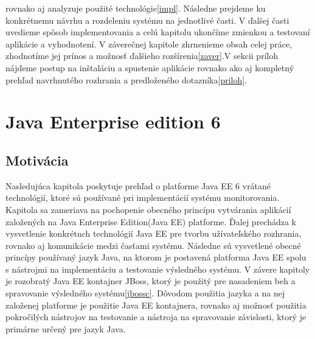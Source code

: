 rovnako aj analyzuje použité technológie\ref{impl}. Následne prejdeme ku konkrétnemu návrhu a rozdeleniu systému na jednotlivé časti. V ďalšej časti uvedieme spôsob implementovania a celú kapitolu ukončíme zmienkou a testovaní aplikácie a vyhodnotení. V záverečnej kapitole zhrnenieme obsah celej práce, zhodnotíme jej prínos a možnosť ďalšieho rozšírenia\ref{zaver}.\newline \indent  V sekcii príloh nájdeme postup na inštaláciu a spustenie aplikácie rovnako ako aj kompletný prehľad navrhnutého rozhrania a predloženého dotazníka\ref{priloh}.


\chapter{Java Enterprise edition 6}\label{JavaEE}
\section{Motivácia}
Nasledujúca kapitola poskytuje prehľad o platforme Java EE 6 vrátané technológií, ktoré sú používané pri implementácií systému monitorovania. Kapitola sa zameriava na pochopenie obecného princípu vytvárania aplikácií založených na Java Enterprise Edition(Java EE) platforme. Ďalej prechádza k vysvetlenie konkrétnch technológií Java EE pre tvorbu užívateľského rozhrania, rovnako aj komunikácie medzi časťami systému. Následne sú vysvetlené obecné princípy používaný jazyk Java, na ktorom je postavená platforma Java EE spolu s nástrojmi na implementáciu a testovanie výsledného systému. \newline \indent V závere kapitoly je rozobratý Java EE kontajner JBoss, ktorý je použitý pre nasadeniem beh a spravovanie výsledného systému\ref{jbossc}. Dôvodom použitia jazyka a na nej založenej platforme je použitie Java EE kontajnera, rovnako aj možnosť použitia pokročilých nástrojov na testovanie a nástroja na spravovanie závislosti, ktorý je primárne určený pre jazyk Java. 


